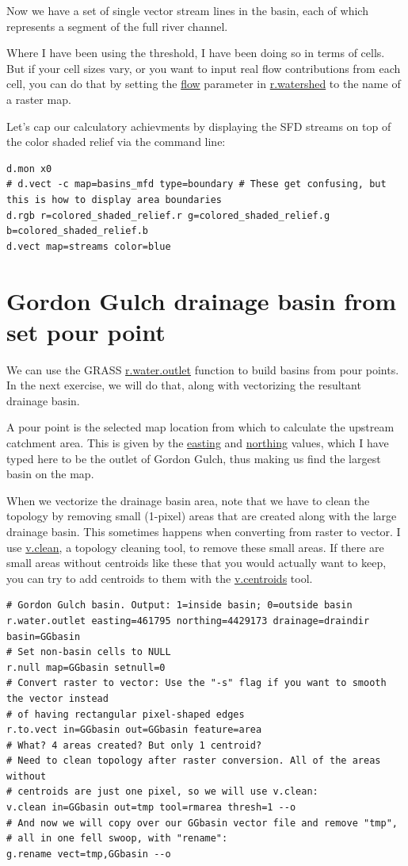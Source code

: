 \documentclass{book}
\begin{document}
Now we have a set of single vector stream lines in the basin, each of which represents a segment of the full river channel.

Where I have been using the threshold, I have been doing so in terms of cells. But if your cell sizes vary, or you want to input real flow contributions from each cell, you can do that by setting the \url{flow} parameter in \url{r.watershed} to the name of a raster map.

Let's cap our calculatory achievments by displaying the SFD streams on top of the color shaded relief via the command line:

\begin{lstlisting}
d.mon x0
# d.vect -c map=basins_mfd type=boundary # These get confusing, but this is how to display area boundaries
d.rgb r=colored_shaded_relief.r g=colored_shaded_relief.g b=colored_shaded_relief.b
d.vect map=streams color=blue
\end{lstlisting}

\section{Gordon Gulch drainage basin from set pour point \label{s:GGbasin}}

We can use the GRASS \url{r.water.outlet} function to build basins from pour points. In the next exercise, we will do that, along with vectorizing the resultant drainage basin.

A pour point is the selected map location from which to calculate the upstream catchment area. This is given by the \url{easting} and \url{northing} values, which I have typed here to be the outlet of Gordon Gulch, thus making us find the largest basin on the map.

When we vectorize the drainage basin area, note that we have to clean the topology by removing small (1-pixel) areas that are created along with the large drainage basin. This sometimes happens when converting from raster to vector. I use \url{v.clean}, a topology cleaning tool, to remove these small areas. If there are small areas without centroids like these that you would actually want to keep, you can try to add centroids to them with the \url{v.centroids} tool.

\begin{lstlisting}
# Gordon Gulch basin. Output: 1=inside basin; 0=outside basin
r.water.outlet easting=461795 northing=4429173 drainage=draindir basin=GGbasin
# Set non-basin cells to NULL
r.null map=GGbasin setnull=0
# Convert raster to vector: Use the "-s" flag if you want to smooth the vector instead
# of having rectangular pixel-shaped edges
r.to.vect in=GGbasin out=GGbasin feature=area
# What? 4 areas created? But only 1 centroid?
# Need to clean topology after raster conversion. All of the areas without
# centroids are just one pixel, so we will use v.clean:
v.clean in=GGbasin out=tmp tool=rmarea thresh=1 --o
# And now we will copy over our GGbasin vector file and remove "tmp",
# all in one fell swoop, with "rename":
g.rename vect=tmp,GGbasin --o
\end{lstlisting}
\end{document}
